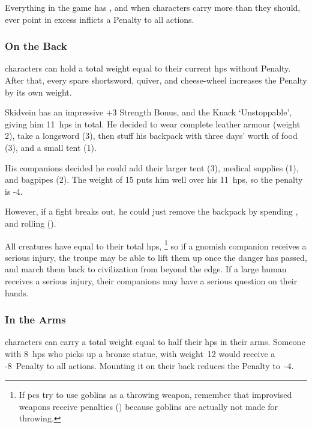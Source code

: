 \begin{multicols}{2}

\noindent%
Everything in the game has , and when characters carry more than they should, ever point in excess inflicts a Penalty to all actions.


\subsubsection{On the Back}
characters can hold a total \gls{weight} equal to their current \glspl{hp} without Penalty.
After that, every spare shortsword, quiver, and cheese-wheel increases the Penalty by its own \gls{weight}.

\begin{exampletext}
  Skidvein has an impressive +3 Strength Bonus, and the Knack `Unstoppable', giving him 11~\glspl{hp} in total.
  He decided to wear complete leather armour (\gls{weight} 2), take a longsword (3), then stuff his backpack with three days' worth of food (3), and a small tent (1).

  His companions decided he could add their larger tent (3), medical supplies (1), and bagpipes (2).
  The \gls{weight} of 15 puts him well over his 11~\glspl{hp}, so the penalty is -4.

  However, if a fight breaks out, he could just remove the backpack by spending , and rolling  (\tn[10]).
\end{exampletext}

All creatures have  equal to their total \glspl{hp},%
\footnote{If \glspl{pc} try to use goblins as a throwing weapon, remember that improvised weapons receive penalties () because goblins are actually not made for throwing.}
so if a gnomish companion receives a serious injury, the troupe may be able to lift them up once the danger has passed, and march them back to civilization from beyond the \gls{edge}.
If a large human receives a serious injury, their companions may have a serious question on their hands.

\subsubsection{In the Arms}
characters can carry a total \gls{weight} equal to half their \glspl{hp} in their arms.
Someone with 8~\glspl{hp} who picks up a bronze statue, with \gls{weight}~12 would receive a -8~Penalty to all actions.
Mounting it on their back reduces the Penalty to~-4.


\end{multicols}
